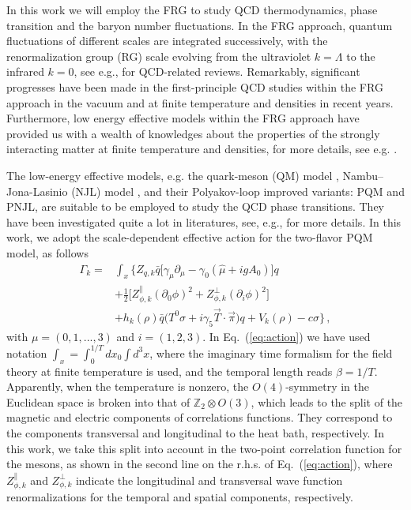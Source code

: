 \documentclass[%
reprint,
superscriptaddress,
showpacs,preprintnumbers,
 amsmath,amssymb,
 aps,
prd,
]{revtex4-1}
\def\Eq#1{Eq.~(\ref{#1})}
\begin{document}
In this work we will employ the FRG to study QCD thermodynamics, phase transition and the baryon number fluctuations. In the FRG approach, quantum fluctuations of different scales are integrated successively, with the renormalization group (RG) scale evolving from the ultraviolet $k=\Lambda$ to the infrared $k=0$, see e.g., \cite{Berges:2000ew,Pawlowski:2005xe,Pawlowski:2010ht,Braun:2011pp} for QCD-related reviews. Remarkably, significant progresses have been made in the first-principle QCD studies within the FRG approach in the vacuum \cite{Mitter:2014wpa,Braun:2014ata,Rennecke:2015eba,Cyrol:2016tym,Cyrol:2017ewj,Cyrol:2017qkl} and at finite temperature and densities \cite{Fu:2019a} in recent years. Furthermore, low energy effective models within the FRG approach have provided us with a wealth of knowledges about the properties of the strongly interacting matter at finite temperature and densities, for more details, see e.g. \cite{Schaefer:2004en,Schaefer:2006sr,Skokov:2010wb,Herbst:2010rf,Schaefer:2011ex,Mitter:2013fxa,Herbst:2013ufa,Tripolt:2013jra,Fu:2015naa,Fu:2015amv,Fu:2016tey,Rennecke:2016tkm,Jung:2016yxl,Braun:2017srn,Fu:2018qsk,Fu:2018swz,Sun:2018ozp,Wen:2018nkn,Li:2019nzj}.

The low-energy effective models, e.g. the quark-meson (QM) model \cite{Schaefer:2004en}, Nambu--Jona-Lasinio (NJL) model \cite{Buballa:2003qv}, and their Polyakov-loop improved variants: PQM and PNJL, are suitable to be employed to study the QCD phase transitions. They have been investigated quite a lot in literatures, see, e.g., \cite{Fukushima:2003fw,Ratti:2005jh,Fu:2007xc,Schaefer:2007pw,Fu:2009wy,Fu:2010ay} for more details. In this work, we adopt the scale-dependent effective action for the two-flavor PQM model, as follows 
\begin{align}
\Gamma_k=&\int_x \bigg\{Z_{q,k}\bar{q} \Big [\gamma_\mu \partial_\mu -\gamma_0(\hat\mu+igA_0) \Big ]q \nonumber\\[2ex]
&+\frac{1}{2}\Big [Z_{\phi,k}^{\parallel}(\partial_0 \phi)^2+Z_{\phi,k}^{\perp}(\partial_i \phi)^2 \Big]\nonumber\\[2ex]
&+h_k(\rho)\bar{q}\big(T^0\sigma+i\gamma_5\vec{T}\cdot \vec{\pi}\big)q+V_k(\rho)-c\sigma \bigg\}\,,\label{eq:action}
\end{align}
with $\mu=(0, 1, ..., 3)$ and $i=(1, 2, 3)$. In \Eq{eq:action} we have used notation $\int_{x}=\int_0^{1/T}d x_0 \int d^3 x$, where the imaginary time formalism for the field theory at finite temperature is used, and the temporal length reads $\beta=1/T$. Apparently, when the temperature is nonzero, the $O(4)$-symmetry in the Euclidean space is broken into that of $\mathbb{Z}_2\otimes O(3)$, which leads to the split of the magnetic and electric components of correlations functions. They correspond to the components transversal and longitudinal to the heat bath, respectively. In this work, we take this split into account in the two-point correlation function for the mesons, as shown in the second line on the r.h.s. of \Eq{eq:action}, where $Z_{\phi,k}^{\parallel}$ and $Z_{\phi,k}^{\perp}$ indicate the longitudinal and transversal wave function renormalizations for the temporal and spatial components, respectively. 
\end{document}
